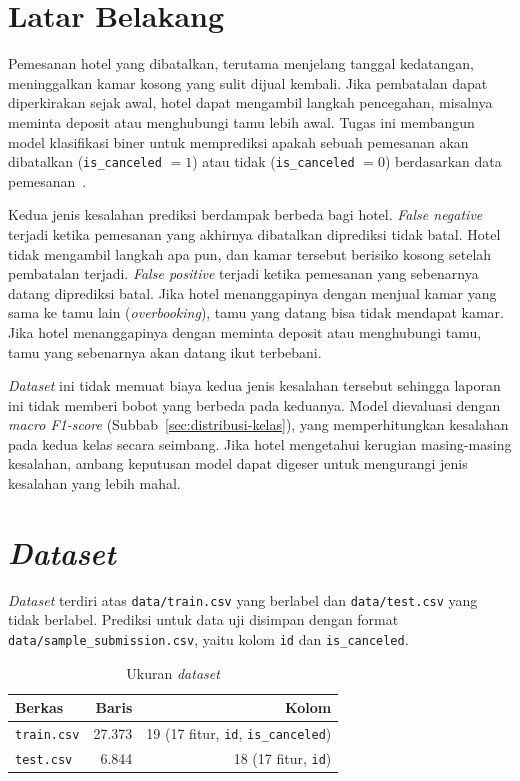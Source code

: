 \section{Latar Belakang}

Pemesanan hotel yang dibatalkan, terutama menjelang tanggal kedatangan,
meninggalkan kamar kosong yang sulit dijual kembali. Jika pembatalan dapat
diperkirakan sejak awal, hotel dapat mengambil langkah pencegahan, misalnya
meminta deposit atau menghubungi tamu lebih awal. Tugas ini membangun model
klasifikasi biner untuk memprediksi apakah sebuah pemesanan akan dibatalkan
(\texttt{is\_canceled} $=1$) atau tidak (\texttt{is\_canceled} $=0$) berdasarkan
data pemesanan~\cite{asisten2026spek}.

Kedua jenis kesalahan prediksi berdampak berbeda bagi hotel. \textit{False
negative} terjadi ketika pemesanan yang akhirnya dibatalkan diprediksi tidak
batal. Hotel tidak mengambil langkah apa pun, dan kamar tersebut berisiko kosong
setelah pembatalan terjadi. \textit{False positive} terjadi ketika pemesanan yang
sebenarnya datang diprediksi batal. Jika hotel menanggapinya dengan menjual kamar
yang sama ke tamu lain (\textit{overbooking}), tamu yang datang bisa tidak
mendapat kamar. Jika hotel menanggapinya dengan meminta deposit atau menghubungi
tamu, tamu yang sebenarnya akan datang ikut terbebani.

\textit{Dataset} ini tidak memuat biaya kedua jenis kesalahan tersebut sehingga
laporan ini tidak memberi bobot yang berbeda pada keduanya. Model dievaluasi
dengan \textit{macro F1-score} (Subbab~\ref{sec:distribusi-kelas}), yang
memperhitungkan kesalahan pada kedua kelas secara seimbang. Jika hotel mengetahui
kerugian masing-masing kesalahan, ambang keputusan model dapat digeser untuk
mengurangi jenis kesalahan yang lebih mahal.

\section{\textit{Dataset}}

\textit{Dataset} terdiri atas \texttt{data/train.csv} yang berlabel dan
\texttt{data/test.csv} yang tidak berlabel. Prediksi untuk data uji disimpan
dengan format \texttt{data/sample\_submission.csv}, yaitu kolom \texttt{id} dan
\texttt{is\_canceled}.

\begin{table}[H]
	\centering
	\caption{Ukuran \textit{dataset}}
	\label{tab:ukuran}
	\begin{tabular}{l r r}
		\toprule
		\textbf{Berkas} & \textbf{Baris} & \textbf{Kolom} \\
		\midrule
		\texttt{train.csv} & 27.373 & 19 (17 fitur, \texttt{id}, \texttt{is\_canceled}) \\
		\texttt{test.csv}  & 6.844  & 18 (17 fitur, \texttt{id}) \\
		\bottomrule
	\end{tabular}
\end{table}

